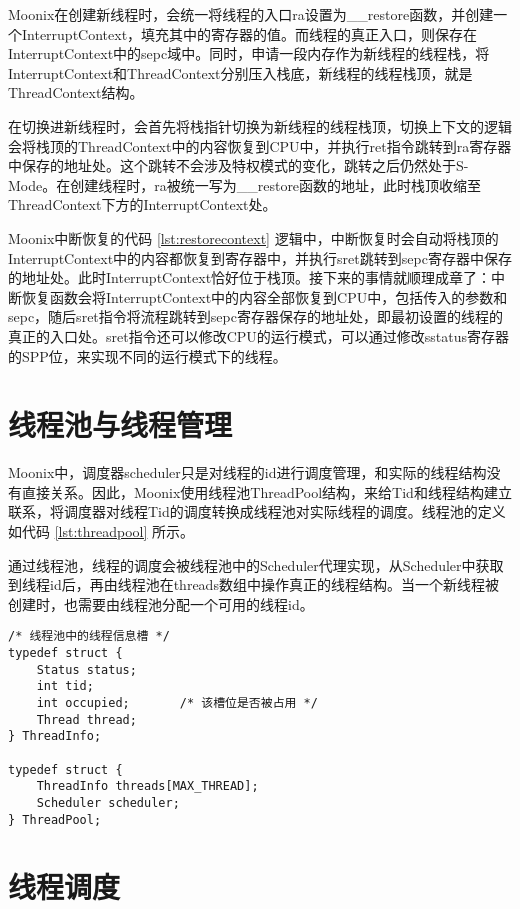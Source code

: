 Moonix在创建新线程时，会统一将线程的入口ra设置为\_\_restore函数，并创建一个InterruptContext，填充其中的寄存器的值。而线程的真正入口，则保存在InterruptContext中的sepc域中。同时，申请一段内存作为新线程的线程栈，将InterruptContext和ThreadContext分别压入栈底，新线程的线程栈顶，就是ThreadContext结构。

在切换进新线程时，会首先将栈指针切换为新线程的线程栈顶，切换上下文的逻辑会将栈顶的ThreadContext中的内容恢复到CPU中，并执行ret指令跳转到ra寄存器中保存的地址处。这个跳转不会涉及特权模式的变化，跳转之后仍然处于S-Mode。在创建线程时，ra被统一写为\_\_restore函数的地址，此时栈顶收缩至ThreadContext下方的InterruptContext处。

Moonix中断恢复的代码 \ref{lst:restorecontext} 逻辑中，中断恢复时会自动将栈顶的InterruptContext中的内容都恢复到寄存器中，并执行sret跳转到sepc寄存器中保存的地址处。此时InterruptContext恰好位于栈顶。接下来的事情就顺理成章了：中断恢复函数会将InterruptContext中的内容全部恢复到CPU中，包括传入的参数和sepc，随后sret指令将流程跳转到sepc寄存器保存的地址处，即最初设置的线程的真正的入口处。sret指令还可以修改CPU的运行模式，可以通过修改sstatus寄存器的SPP位，来实现不同的运行模式下的线程。

\section{线程池与线程管理}

Moonix中，调度器scheduler只是对线程的id进行调度管理，和实际的线程结构没有直接关系。因此，Moonix使用线程池ThreadPool结构，来给Tid和线程结构建立联系，将调度器对线程Tid的调度转换成线程池对实际线程的调度。线程池的定义如代码 \ref{lst:threadpool} 所示。

通过线程池，线程的调度会被线程池中的Scheduler代理实现，从Scheduler中获取到线程id后，再由线程池在threads数组中操作真正的线程结构。当一个新线程被创建时，也需要由线程池分配一个可用的线程id。

\begin{minipage}[c]{0.95\textwidth}
\begin{lstlisting}[language={moonix}, caption={线程池定义}, label={lst:threadpool}]
/* 线程池中的线程信息槽 */
typedef struct {
	Status status;
	int tid;
	int occupied;       /* 该槽位是否被占用 */
	Thread thread;
} ThreadInfo;
	
typedef struct {
	ThreadInfo threads[MAX_THREAD];
	Scheduler scheduler;
} ThreadPool;
\end{lstlisting}
\end{minipage}

\section{线程调度}

